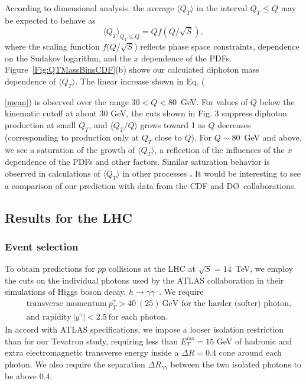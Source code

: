 \documentclass[12pt,english,aps,preprint,prd,letterpaper,fleqn,nofootinbib,showpacs,showkeys,tightenlines,floatfix]{revtex4}
\begin{document}
According to dimensional analysis, the average $\langle Q_{T}\rangle$
in the interval $Q_{T}\leq Q$ may be expected to behave as \begin{equation}
\langle Q_{T}\rangle_{Q_{T}\leq Q}=Qf(Q/\sqrt{S}),\label{mean}\end{equation}
 where the scaling function $f(Q/\sqrt{S}$) reflects phase space
constraints, dependence on 
the Sudakov logarithm, and the $x$ dependence
of the PDFs. Figure~\ref{Fig:QTMassBinsCDF}(b)
shows our calculated diphoton mass dependence of $\langle Q_{T}\rangle$.
The linear increase shown in Eq. ({\ref{mean}) is observed over the
range $30<Q<80$~GeV. For values of $Q$ below the kinematic cutoff
at about 30 GeV, the cuts shown in Fig. 3 suppress diphoton production
at small $Q_{T}$, and $\langle Q_{T}/Q\rangle$ grows toward 1 as
$Q$ decreases (corresponding to production only at $Q_{T}$ close
to $Q$). For $Q\sim80$~GeV and above, we see a saturation of the
growth of $\langle Q_{T}\rangle$, a reflection of the influences
of the $x$ dependence of the PDFs and other factors. Similar saturation
behavior is observed in calculations of $\langle Q_{T}\rangle$ in
other processes \textbf{}\cite{Berger:2002ut}\textbf{.} It would
be interesting to see a comparison of our prediction with data from
the CDF and D\O~collaborations.

\subsection{Results for the LHC}

\subsubsection{Event selection}

To obtain predictions for $pp$ collisions at the LHC at $\sqrt{S}=14$~TeV,
we employ the cuts on the individual photons used by the ATLAS collaboration
in their simulations of Higgs boson decay, $h\rightarrow\gamma\gamma$~\cite{ATLAS:1999fr}.
We require \begin{eqnarray}
 &  & {\textrm{transverse momentum}}~p_{T}^{\gamma}>40~(25)~{\textrm{GeV for the harder (softer) photon, }}\label{pTcutLHC}\\
 &  & {\textrm{and rapidity}}~|y^{\gamma}|<2.5~{\textrm{for each photon}}.\label{ycutLHC}\end{eqnarray}
 In accord with ATLAS specifications, we impose a looser isolation
restriction than for our Tevatron study, requiring less than $E_{T}^{iso}=15$
GeV of hadronic and extra electromagnetic transverse energy inside
a $\Delta R=0.4$ cone around each photon. We also require the separation
$\Delta R_{\gamma\gamma}$ between the two isolated photons to be
above 0.4.

}
\end{document}
